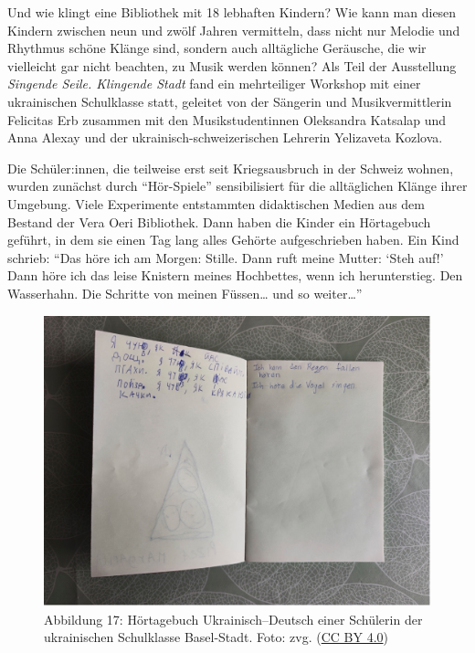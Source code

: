 \documentclass[a4paper,
fontsize=11pt,
oneside,
numbers=noperiodatend,
parskip=half-,
bibliography=totoc,
final
]{scrartcl}
\begin{document}
Und wie klingt eine Bibliothek mit 18 lebhaften Kindern? Wie kann man
diesen Kindern zwischen neun und zwölf Jahren vermitteln, dass nicht nur
Melodie und Rhythmus schöne Klänge sind, sondern auch alltägliche
Geräusche, die wir vielleicht gar nicht beachten, zu Musik werden
können? Als Teil der Ausstellung \emph{Singende Seile. Klingende Stadt}
fand ein mehrteiliger Workshop mit einer ukrainischen Schulklasse statt,
geleitet von der Sängerin und Musikvermittlerin Felicitas Erb zusammen
mit den Musikstudentinnen Oleksandra Katsalap und Anna Alexay und der
ukrainisch-schweizerischen Lehrerin Yelizaveta Kozlova.

Die Schüler:innen, die teilweise erst seit Kriegsausbruch in der Schweiz
wohnen, wurden zunächst durch \enquote{Hör-Spiele} sensibilisiert für
die alltäglichen Klänge ihrer Umgebung. Viele Experimente entstammten
didaktischen Medien aus dem Bestand der Vera Oeri Bibliothek. Dann haben
die Kinder ein Hörtagebuch geführt, in dem sie einen Tag lang alles
Gehörte aufgeschrieben haben. Ein Kind schrieb: \enquote{Das höre ich am
Morgen: Stille. Dann ruft meine Mutter: \enquote{Steh auf!} Dann höre ich das
leise Knistern meines Hochbettes, wenn ich herunterstieg. Den
Wasserhahn. Die Schritte von meinen Füssen\ldots{} und so weiter\ldots}

\begin{figure}
\centering
\includegraphics{img/Abb17.jpg}
\caption{Abbildung 17: Hörtagebuch Ukrainisch--Deutsch einer Schülerin der
ukrainischen Schulklasse Basel-Stadt. Foto: zvg. (\href{https://creativecommons.org/licenses/by/4.0/}{CC BY 4.0})}
\end{figure}
\end{document}
